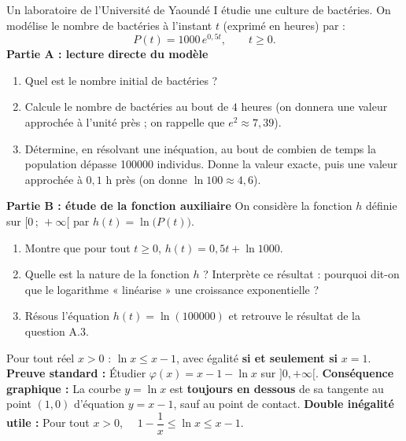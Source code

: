 \documentclass[11pt]{article}
\begin{document}
\begin{exercice}
Un laboratoire de l'Université de Yaoundé I étudie une culture de bactéries. On modélise le nombre de bactéries à l'instant $t$ (exprimé en heures) par :
\[
P(t) = 1000\,e^{0,5t}, \qquad t \geq 0.
\]
\textbf{Partie A : lecture directe du modèle}
\begin{enumerate}
\item Quel est le nombre initial de bactéries ?
\item Calcule le nombre de bactéries au bout de $4$ heures (on donnera une valeur approchée à l'unité près ; on rappelle que $e^2 \approx 7,39$).
\item Détermine, en résolvant une inéquation, au bout de combien de temps la population dépasse \num{100000} individus. Donne la valeur exacte, puis une valeur approchée à $0,1$ h près (on donne $\ln 100 \approx 4,6$).
\end{enumerate}
\textbf{Partie B : étude de la fonction auxiliaire}
On considère la fonction $h$ définie sur $[0\,;\,+\infty[$ par $h(t) = \ln\bigl(P(t)\bigr)$.
\begin{enumerate}
\item Montre que pour tout $t \geq 0$, $h(t) = 0,5t + \ln 1000$.
\item Quelle est la nature de la fonction $h$ ? Interprète ce résultat : pourquoi dit-on que le logarithme « linéarise » une croissance exponentielle ?
\item Résous l'équation $h(t) = \ln(100000)$ et retrouve le résultat de la question A.3.
\end{enumerate}
\end{exercice}

\begin{aretenir}
Pour tout réel $x > 0$ : $\ln x \leq x - 1$, avec égalité \textbf{si et seulement si} $x = 1$.
\textbf{Preuve standard :} Étudier $\varphi(x) = x - 1 - \ln x$ sur $]0, +\infty[$.
\textbf{Conséquence graphique :} La courbe $y = \ln x$ est \textbf{toujours en dessous} de sa tangente au point $(1,0)$ d'équation $y = x-1$, sauf au point de contact.
\textbf{Double inégalité utile :} Pour tout $x > 0$, $\quad 1 - \dfrac{1}{x} \leq \ln x \leq x - 1$.
\end{aretenir}
\end{document}
